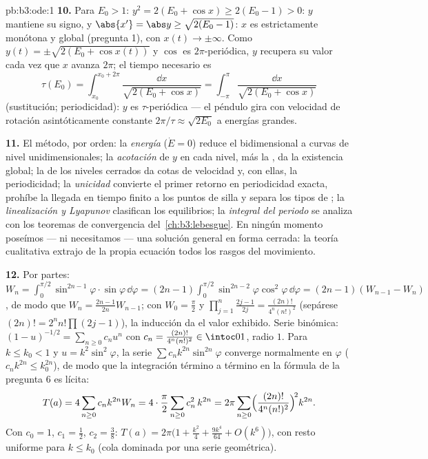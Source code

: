 \begin{solution}{pb:b3:ode:1}
\textbf{10.} Para $E_0 > 1$: $y^2 = 2(E_0 + \cos x) \geq
2(E_0 - 1) > 0$: $y$ mantiene su signo, y $\abs{x'} = \abs y
\geq \sqrt{2(E_0 - 1)}$: $x$ es estrictamente monótona y global
(pregunta 1), con $x(t) \to \pm\infty$. Como $y(t) =
\pm\sqrt{2(E_0 + \cos x(t))}$ y $\cos$ es $2\pi$-periódica, $y$ recupera
su valor cada vez que $x$ avanza $2\pi$; el tiempo necesario es
\[
\tau(E_0) = \int_{x_0}^{x_0 + 2\pi}\frac{\dd
x}{\sqrt{2(E_0 + \cos x)}} =
\int_{-\pi}^{\pi}\frac{\dd x}{\sqrt{2(E_0 + \cos x)}}
\]
(sustitución; periodicidad): $y$ es $\tau$-periódica --- el péndulo gira
con velocidad de rotación asintóticamente constante
$2\pi/\tau \approx \sqrt{2E_0}$ a energías grandes.

\textbf{11.} El método, por orden: la \emph{energía} ($\dot E =
0$) reduce el 
bidimensional a curvas de nivel unidimensionales; la \emph{acotación} de
$y$ en cada nivel, más la , da la existencia
global; la \emph{} de los niveles cerrados da cotas de
velocidad y, con ellas, la periodicidad; la \emph{unicidad} convierte el
primer retorno en periodicidad exacta, prohíbe la llegada en tiempo
finito a los puntos de silla y separa los tipos de
; la \emph{linealización y
Lyapunov} clasifican los equilibrios; la \emph{integral del periodo} se
analiza con los teoremas de convergencia del~\cref{ch:b3:lebesgue}. En
ningún momento poseímos --- ni necesitamos --- una solución general en
forma cerrada: la teoría cualitativa extrajo de la propia ecuación todos
los rasgos del movimiento.

\textbf{12.} Por partes: $W_n = \int_0^{\pi/2}\sin^{2n-1}\varphi
\cdot\sin\varphi\,\dd\varphi = (2n-1)\int_0^{\pi/2}
\sin^{2n-2}\varphi\cos^2\varphi\,\dd\varphi = (2n-1)(W_{n-1}
- W_n)$, de modo que $W_n = \frac{2n-1}{2n}W_{n-1}$; con $W_0 =
\frac\pi2$ y $\prod_{j=1}^n\frac{2j-1}{2j} =
\frac{(2n)!}{4^n(n!)^2}$ (sepárese $(2n)! = 2^nn!\prod(2j-1)$), la
inducción da el valor exhibido. Serie binómica: $(1 -
u)^{-1/2} = \sum_{n\geq0}c_nu^n$ con $c_n =
\frac{(2n)!}{4^n(n!)^2} \in \intoc01$, radio $1$. Para $k
\leq k_0 < 1$ y $u = k^2\sin^2\varphi$, la serie
$\sum c_nk^{2n}\sin^{2n}\varphi$ converge normalmente en $\varphi$
($c_nk^{2n} \leq k_0^{2n}$), de modo que la integración término a
término en la fórmula de la pregunta 6 es lícita:
\[
T(a) = 4\sum_{n\geq0}c_nk^{2n}W_n
= 4\cdot\frac\pi2\sum_{n\geq0}c_n^2\,k^{2n}
= 2\pi\sum_{n\geq0}
\Bigl(\frac{(2n)!}{4^n(n!)^2}\Bigr)^{\!2}k^{2n} .
\]
Con $c_0 = 1$, $c_1 = \frac12$, $c_2 = \frac38$: $T(a) =
2\pi\bigl(1 + \frac{k^2}4 + \frac{9k^4}{64} + O(k^6)\bigr)$, con resto
uniforme para $k \leq k_0$ (cola dominada por una serie geométrica).


\end{solution}
